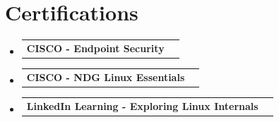 \documentclass[a4paper,11pt]{article}
\makeatletter
\newcommand{\resumePOR}[3]{
\vspace{0.5mm}\item
    \begin{tabular*}{0.97\textwidth}[t]{l@{\extracolsep{\fill}}r}
        \textbf{#1}\hspace{0.3mm}#2 & \textit{\small{#3}} 
    \end{tabular*}
    \vspace{-2mm}
}
\newcommand{\resumeSubHeadingListStart}{\begin{itemize}[leftmargin=*,labelsep=0mm]}
\newcommand{\resumeSubHeadingListEnd}{\end{itemize}\vspace{2mm}}
\makeatother
\begin{document}
\section{\textbf{Certifications}}
\vspace{-0.4mm}
\resumeSubHeadingListStart
\resumePOR{CISCO - Endpoint Security}{}{}
\resumePOR{CISCO - NDG Linux Essentials}{}{}
\resumePOR{LinkedIn Learning - Exploring Linux Internals}{}{}
\resumeSubHeadingListEnd
\vspace{-5mm}





    



\end{document}
